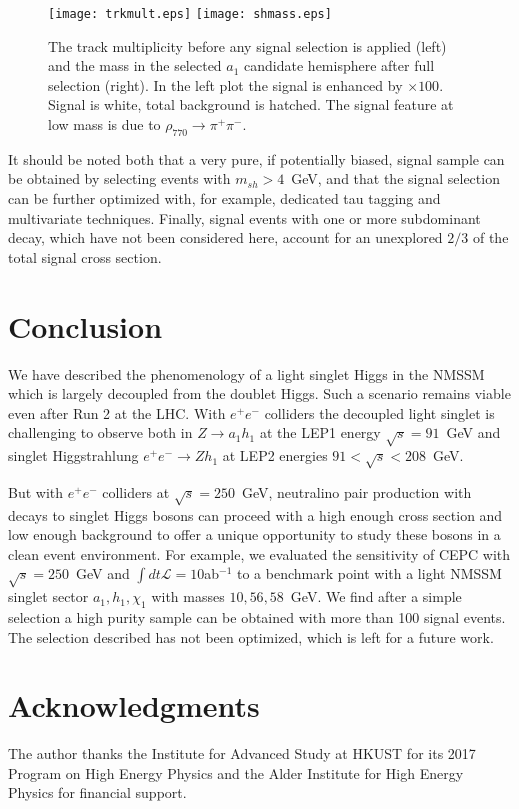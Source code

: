 \documentclass{ws-ijmpa}
\begin{document}
\begin{figure}[h]
\begin{center}
\texttt{[image: trkmult.eps]}
\texttt{[image: shmass.eps]}
\caption{The track multiplicity before any signal selection is applied (left) and the mass in the selected $a_1$ candidate hemisphere after full selection (right). In the left plot the signal is enhanced by $\times100$. Signal is white, total background is hatched. The signal feature at low mass is due to $\rho_{770} \rightarrow \pi^+ \pi^-$.}
\label{fig:analysis}
\end{center}
\end{figure}

It should be noted both that a very pure, if potentially biased, signal sample can be obtained by selecting events with $m_{sh}>4$~GeV, and that the signal selection can be further optimized with, for example, dedicated tau tagging and multivariate techniques.  Finally, signal events with one or more subdominant decay, which have not been considered here, account for an unexplored $2/3$ of the total signal cross section.

\section{Conclusion}

We have described the phenomenology of a light singlet Higgs in the NMSSM which is largely decoupled from the doublet Higgs. Such a scenario remains viable even after Run 2 at the LHC. With $e^+ e^-$ colliders the decoupled light singlet is challenging to observe both in $Z \rightarrow a_1 h_1$ at the LEP1 energy $\sqrt{s}=91$~GeV and singlet Higgstrahlung $e^+ e^- \rightarrow Zh_1$ at LEP2 energies $91 < \sqrt{s} < 208$~GeV.

But with $e^+ e^-$ colliders at $\sqrt{s}=250$~GeV, neutralino pair production with decays to singlet Higgs bosons can proceed with a high enough cross section and low enough background to offer a unique opportunity to study these bosons in a clean event environment. For example, we evaluated the sensitivity of CEPC with $\sqrt{s}=250$~GeV and $\int dt \mathcal{L}=10$ab$^{-1}$ to a benchmark point with a light NMSSM singlet sector $a_1,h_1,\chi_1$ with masses $10,56,58$~GeV. We find after a simple selection a high purity sample can be obtained with more than 100 signal events. The selection described has not been optimized, which is left for a future work.

\section*{Acknowledgments}
The author thanks the Institute for Advanced Study at HKUST for its 2017 Program on High Energy Physics and the Alder Institute for High Energy Physics for financial support.


\end{document}
